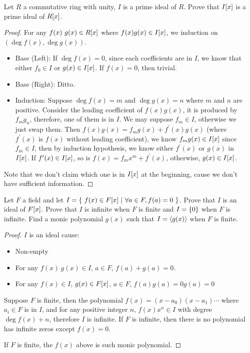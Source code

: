 \documentclass[../main.tex]{subfiles}
\begin{document}
\setcounter{exercise}{65}
\begin{exercise}
  Let $R$ a commutative ring with unity, $I$ is a prime ideal of $R$.
  Prove that $I[x]$ is a prime ideal of $R[x]$.
\end{exercise}
\begin{proof}
  For any $f(x) \ g(x) \in R[x]$ where $f(x)g(x) \in I[x]$,
  we induction on $(\deg f(x) , \deg g(x))$.
  \begin{itemize}
    \item Base (Left): If $\deg f(x) = 0$, since each coefficients are in $I$,
          we know that either $f_0 \in I$ or $g(x) \in I[x]$. If $f(x) = 0$,
          then trivial.
    \item Base (Right):   Ditto.
    \item Induction: Suppose $\deg f(x) = m$ and $\deg g(x) = n$ where $m$ and $n$ are positive.
          Consider the leading coefficient of $f(x)g(x)$, it is produced by $f_m g_n$,
          therefore, one of them is in $I$. We may suppose $f_m \in I$, otherwise
          we just swap them.
          Then $f(x)g(x) = f_mg(x) + f^\prime(x)g(x)$ (where $f^\prime(x)$ is $f(x)$ without leading coefficient),
          we know $f_mg(x) \in I[x]$ since $f_m \in I$, then by induction hypothesis,
          we know either $f^\prime(x)$ or $g(x)$ in $I[x]$.
          If $f^\prime(x) \in I[x]$, so is $f(x) = f_m x^m + f^\prime(x)$,
          otherwise, $g(x) \in I[x]$.
  \end{itemize}

  Note that we don't claim which one is in $I[x]$ at the beginning, cause we don't have
  sufficient information.
\end{proof}

\setcounter{exercise}{69}
\begin{exercise}
  Let $F$ a field and let $I = \{ \ f(x) \in F[x] \ | \ \forall a \in F, f(a) = 0 \ \}$.
  Prove that $I$ is an ideal of $F[x]$.
  Prove that $I$ is infinite when $F$ is finite and $I = \{0\}$ when $F$ is infinite.
  Find a monic polynomial $g(x)$ such that $I = \langle g(x) \rangle$ when $F$ is finite.
\end{exercise}
\begin{proof}
  $I$ is an ideal cause:
  \begin{itemize}
    \item Non-empty
    \item For any $f(x) \ g(x) \in I$, $a \in F$, $f(a) + g(a) = 0$.
    \item For any $f(x) \in I$, $g(x) \in F[x]$, $a \in F$, $f(a)g(a) = 0g(a) = 0$
  \end{itemize}

  Suppose $F$ is finite, then the polynomial $f(x) = (x - a_0)(x - a_1) \cdots$ where $a_i \in F$
  is in $I$, and for any positive integer $n$, $f(x)x^n \in I$ with degree $\deg f(x) + n$,
  therefore $I$ is infinite.
  If $F$ is infinite, then there is no polynomial has infinite zeros except $f(x) = 0$.

  If $F$ is finite, the $f(x)$ above is such monic polynomial.
\end{proof}
\end{document}
